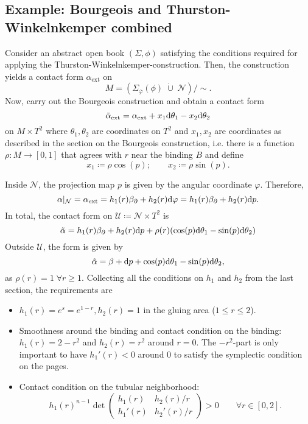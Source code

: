 \subsection{Example: Bourgeois and Thurston-Winkelnkemper combined}
Consider an abstract open book $(\Sigma, \phi)$ satisfying the
conditions required for applying the Thurston-Winkelnkemper-construction.
Then, the construction yields a contact form $\alpha_\text{ext}$ on
\[
    M = \left(\Sigma_{\overline{\varphi}}(\phi)\; \dot\cup\; \mathcal{N}\right)/\sim.
\]
Now, carry out the Bourgeois construction and obtain a contact form
\[
    \tilde \alpha_\text{ext} = \alpha_\text{ext} + x_1 \mathrm{d} \theta_1 - x_2 \mathrm{d}\theta_2
\]
on $M \times T^2$ where $\theta_1, \theta_2$ are coordinates on $T^2$
and $x_1, x_2$ are coordinates as described in the section on the Bourgeois construction, 
i.e. there is a function $\rho: M \to [0,1]$ that agrees with $r$ near the binding $B$ and define
\[
    x_1 \coloneqq \rho \cos(p);\qquad x_2 \coloneqq \rho \sin(p).
\]

Inside $\mathcal{N}$, the projection map $p$ is given by the angular coordinate $\varphi$. Therefore,
\[
    \alpha|_\mathcal{N} = \alpha_\text{ext} = h_1(r)\beta_\partial + h_2(r)\mathrm{d} \varphi = h_1(r)\beta_\partial + h_2(r)\mathrm{d} p.
\]
In total, the contact form on $\mathcal{U} \coloneqq \mathcal{N}\times T^2$ is
\[
    \tilde \alpha = h_1(r)\beta_\partial + h_2(r)\mathrm{d} p + \rho(r)(\cos(p) \mathrm{d} \theta_1 - \sin(p) \mathrm{d} \theta_2)
\]
Outside $\mathcal{U}$, the form is given by
\[
    \tilde \alpha = \beta + \mathrm{d} p + \cos(p) \mathrm{d}\theta_1 - \sin(p) \mathrm{d} \theta_2,
\]
as $\rho(r) = 1\; \forall r \geq 1$.
Collecting all the conditions on $h_1$ and $h_2$ from the last section, the requirements are
\begin{itemize}
    \item $h_1(r) = e^s = e^{1-r}, h_2(r) = 1$ in the gluing area ($ 1 \le r \le 2$).
    \item Smoothness around the binding and contact condition on the binding: $h_1(r) = 2 - r^2$ and $h_2(r) = r^2$ around $r = 0$.
    The $-r^2$-part is only important to have $h_1'(r) < 0$ around $0$ to satisfy the symplectic condition on the pages.
    \item Contact condition on the tubular neighborhood: \[
        h_1(r)^{n-1}\det \begin{pmatrix}
            h_1(r) & h_2(r)/r\\
            h_1'(r) & h_2'(r)/r
        \end{pmatrix} > 0 \qquad \forall r \in [0,2].
    \]
\end{itemize}

